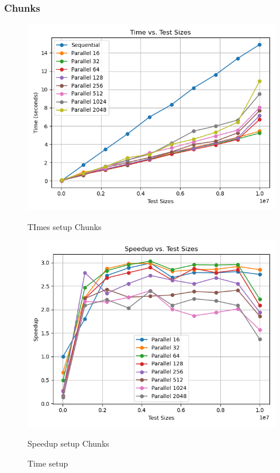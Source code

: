 \documentclass[11pt]{article}
\begin{document}
    \subsubsection{Chunks}\label{subsubsec:005-chunks}
    \begin{figure}[H]
        \centering
        \includegraphics[width=\linewidth]{joblib/005/chunks_time_plot}
            \caption{TImes setup Chunks}\label{fig:005-chunks_time}
        \endminipage\hfill
        \includegraphics[width=\linewidth]{joblib/005/chunks_speedup_plot}
            \caption{Speedup setup Chunks}\label{fig:005-chunks_speedup}
        \endminipage\hfill
        \caption{Time setup}
    \end{figure}
\end{document}
